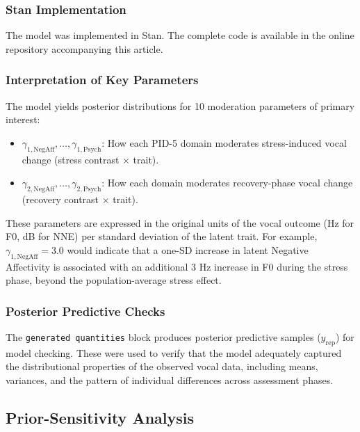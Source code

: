 \documentclass[
  english,
  man,floatsintext]{apa6}
\providecommand{\tightlist}{%
  \setlength{\itemsep}{0pt}\setlength{\parskip}{0pt}}
\begin{document}
\subsubsection{Stan Implementation}\label{stan-implementation}

The model was implemented in Stan. The complete code is available in the online repository accompanying this article.

\subsubsection{Interpretation of Key Parameters}\label{interpretation-of-key-parameters}

The model yields posterior distributions for 10 moderation parameters of primary interest:

\begin{itemize}
\tightlist
\item
  \(\gamma_{1,\text{NegAff}}, \ldots, \gamma_{1,\text{Psych}}\): How each PID-5 domain moderates stress-induced vocal change (stress contrast × trait).
\item
  \(\gamma_{2,\text{NegAff}}, \ldots, \gamma_{2,\text{Psych}}\): How each domain moderates recovery-phase vocal change (recovery contrast × trait).
\end{itemize}

These parameters are expressed in the original units of the vocal outcome (Hz for F0, dB for NNE) per standard deviation of the latent trait. For example, \(\gamma_{1,\text{NegAff}} = 3.0\) would indicate that a one-SD increase in latent Negative Affectivity is associated with an additional 3 Hz increase in F0 during the stress phase, beyond the population-average stress effect.

\subsubsection{Posterior Predictive Checks}\label{posterior-predictive-checks}

The \texttt{generated\ quantities} block produces posterior predictive samples (\(y_{\text{rep}}\)) for model checking. These were used to verify that the model adequately captured the distributional properties of the observed vocal data, including means, variances, and the pattern of individual differences across assessment phases.

\subsection{Prior-Sensitivity Analysis}\label{s-prior-sensitivity}
\end{document}
